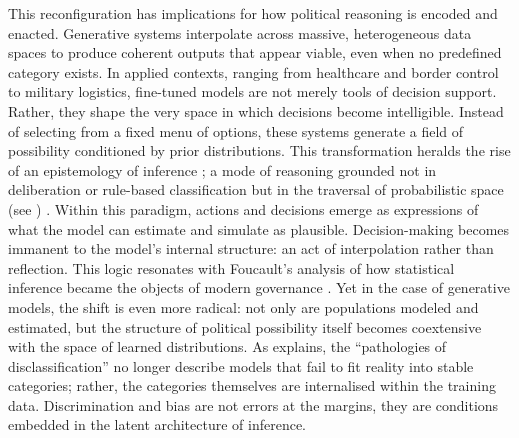 This reconfiguration has implications for how political reasoning is encoded and enacted. Generative systems interpolate across massive, heterogeneous data spaces to produce coherent outputs that appear viable, even when no predefined category exists. In applied contexts, ranging from healthcare and border control to military logistics, fine-tuned models are not merely tools of decision support. Rather, they shape the very space in which decisions become intelligible. Instead of selecting from a fixed menu of options, these systems generate a field of possibility conditioned by prior distributions. This transformation heralds the rise of an epistemology of inference ; a mode of reasoning grounded not in deliberation or rule-based classification but in the traversal of probabilistic space (see \cite[4-6]{amoore2024}) . Within this paradigm, actions and decisions emerge as expressions of what the model can estimate and simulate as plausible. Decision-making becomes immanent to the model’s internal structure: an act of interpolation rather than reflection. This logic resonates with Foucault’s analysis of how statistical inference became the objects of modern governance \parencite[108--109]{foucault2009a}. Yet in the case of generative models, the shift is even more radical: not only are populations modeled and estimated, but the structure of political possibility itself becomes coextensive with the space of learned distributions. As \textcite[3-6]{amoore2024} explains, the ``pathologies of disclassification'' no longer describe models that fail to fit reality into stable categories; rather, the categories themselves are internalised within the training data. Discrimination and bias are not errors at the margins, they are conditions embedded in the latent architecture of inference.

